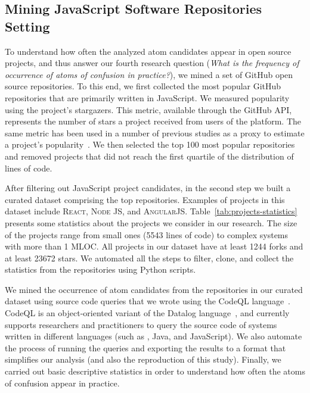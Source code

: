 \subsection{Mining JavaScript Software Repositories Setting}

To understand how often the analyzed atom candidates appear in open source projects, and thus answer our fourth research question (\emph{What is the frequency of occurrence of atoms of confusion in practice?}), we mined a set of GitHub open source repositories. To this end, we first collected the most popular GitHub repositories that are primarily written in JavaScript. We measured popularity using the project's stargazers. This metric, available through the GitHub API, represents the number of stars a project received from users of the platform. The same metric has been used in a number of previous studies as a proxy to estimate a project's popularity~\cite{gyimesi2019bugsjs,canedo:esem2020}. We then selected the top 100 most popular repositories and removed projects that did not reach the first quartile of the distribution of lines of code.

After filtering out JavaScript project candidates, in the second step we built a curated dataset comprising the top \minedprojects repositories. Examples of projects in this dataset include \textsc{React}, \textsc{Node JS}, and \textsc{AngularJS}. Table~\ref{tab:projects-statistics} presents some statistics about the projects we consider in our research. The size of the projects range from small ones (5543 lines of code) to complex systems with more than 1 MLOC. All projects in our dataset have at least \num{1244} forks and at least \num{23672} stars. We automated all the steps to filter, clone, and collect the statistics from the repositories using Python scripts.

We mined the occurrence of atom candidates from the repositories in our curated dataset using source code queries that we wrote using the CodeQL language~\cite{moor:gttse2007}. CodeQL is an object-oriented variant of the Datalog language~\cite{rodriguez2020efficient}, and currently supports researchers and practitioners to query the source code of systems written in different languages (such as \cpplang, Java, and JavaScript). We also automate the process of running the queries and exporting the results to a format that simplifies our analysis (and also the reproduction of this study). Finally, we carried out basic descriptive statistics in order to understand how often the atoms of confusion appear in practice. 

